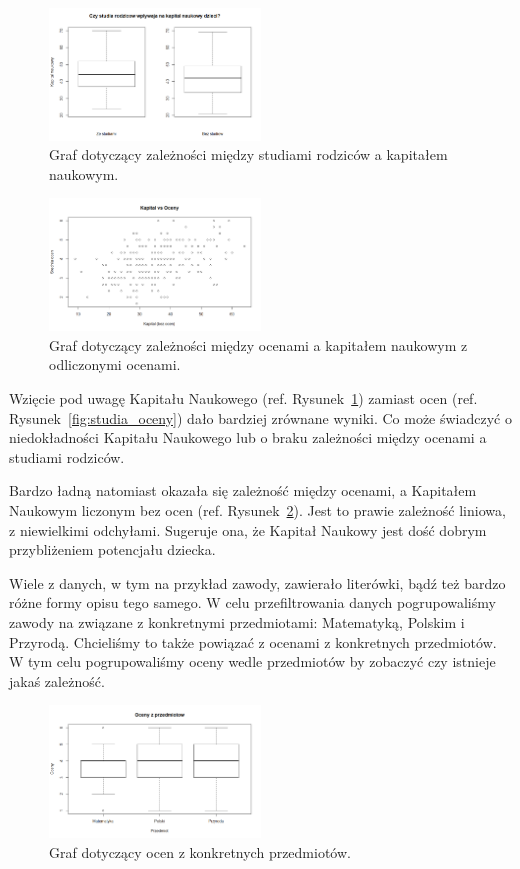 \documentclass[conference]{IEEEtran}
\begin{document}
\begin{figure}
	\centering
	\includegraphics[width=0.5\textwidth]{6.png}
	\caption{Graf dotyczący zależności między studiami rodziców a kapitałem naukowym.}
	\label{fig:studia_kapital}
\end{figure}
\begin{figure}
	\centering
	\includegraphics[width=0.5\textwidth]{7.png}
	\caption{Graf dotyczący zależności między ocenami a kapitałem naukowym z odliczonymi ocenami.}
	\label{fig:oceny_kapital}
\end{figure}

Wzięcie pod uwagę Kapitału Naukowego (ref. Rysunek~\ref{fig:studia_kapital}) zamiast ocen (ref. Rysunek~\ref{fig:studia_oceny}) dało bardziej zrównane wyniki. Co może świadczyć o niedokładności Kapitału Naukowego lub o braku zależności między ocenami a studiami rodziców.

Bardzo ładną natomiast okazała się zależność między ocenami, a Kapitałem Naukowym liczonym bez ocen (ref. Rysunek~\ref{fig:oceny_kapital}). Jest to prawie zależność liniowa, z niewielkimi odchyłami. Sugeruje ona, że Kapitał Naukowy jest dość dobrym przybliżeniem potencjału dziecka.

Wiele z danych, w tym na przykład zawody, zawierało literówki, bądź też bardzo różne formy opisu tego samego. W celu przefiltrowania danych pogrupowaliśmy zawody na związane z konkretnymi przedmiotami: Matematyką, Polskim i Przyrodą.
Chcieliśmy to także powiązać z ocenami z konkretnych przedmiotów. W tym celu pogrupowaliśmy oceny wedle przedmiotów by zobaczyć czy istnieje jakaś zależność.

\begin{figure}
	\centering
	\includegraphics[width=0.5\textwidth]{8.png}
	\caption{Graf dotyczący ocen z konkretnych przedmiotów.}
	\label{fig:oceny}
\end{figure}
\end{document}
